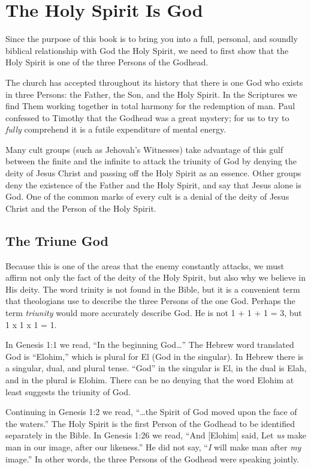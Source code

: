 \chapter{The Holy Spirit Is God}

Since the purpose of this book is to bring you into a full,
personal, and soundly biblical relationship with God the
Holy Spirit, we need to first show that the Holy Spirit is one
of the three Persons of the Godhead.

The church has accepted throughout its history that
there is one God who exists in three Persons: the Father, the
Son, and the Holy Spirit. In the Scriptures we find Them
working together in total harmony for the redemption of
man. Paul confessed to Timothy that the Godhead was a
great mystery; for us to try to \emph{fully} comprehend it is a futile
expenditure of mental energy.

Many cult groups (such as Jehovah’s Witnesses) take
advantage of this gulf between the finite and the infinite
to attack the triunity of God by denying the deity of Jesus
Christ and passing off the Holy Spirit as an essence. Other
groups deny the existence of the Father and the Holy Spirit,
and say that Jesus alone is God. One of the common marks
of every cult is a denial of the deity of Jesus Christ and the
Person of the Holy Spirit.

\section*{The Triune God}

Because this is one of the areas that the enemy constantly
attacks, we must affirm not only the fact of the deity
of the Holy Spirit, but also why we believe in His deity. The
word trinity is not found in the Bible, but it is a convenient
term that theologians use to describe the three Persons of
the one God. Perhaps the term \emph{triunity} would more accurately
describe God. He is not 1 + 1 + 1 = 3, but 1 x 1 x 1 =
1.

In Genesis 1:1 we read, “In the beginning God…” The
Hebrew word translated God is “Elohim,” which is plural for
El (God in the singular). In Hebrew there is a singular, dual,
and plural tense. “God” in the singular is El, in the dual is
Elah, and in the plural is Elohim. There can be no denying
that the word Elohim at least suggests the triunity of God.

Continuing in Genesis 1:2 we read, “…the Spirit of God
moved upon the face of the waters.” The Holy Spirit is the
first Person of the Godhead to be identified separately in the
Bible. In Genesis 1:26 we read, “And [Elohim] said, Let \emph{us}
make man in our image, after our likeness.” He did not say,
“\emph{I} will make man after \emph{my} image.” In other words, the three
Persons of the Godhead were speaking jointly.



